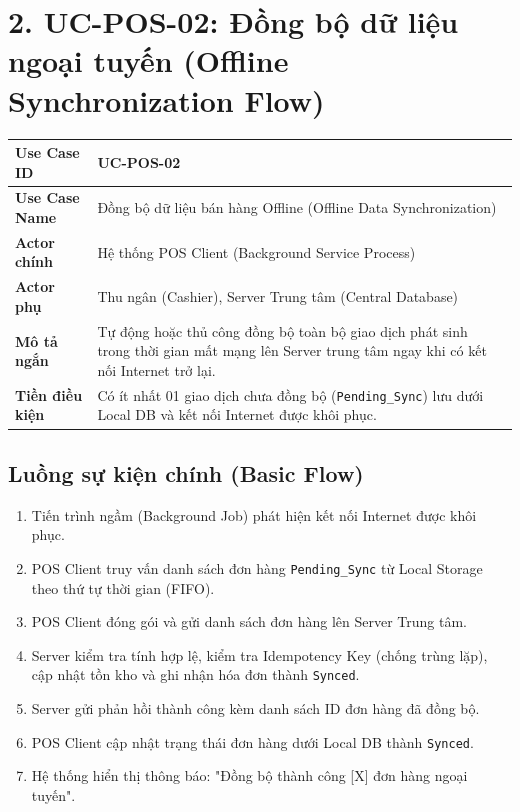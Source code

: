 \documentclass[11pt,a4paper]{article}
\begin{document}
	\vspace{1.5em}
	
	\section{2. UC-POS-02: Đồng bộ dữ liệu ngoại tuyến (Offline Synchronization Flow)}
	
	\begin{tabularx}{\textwidth}{|>{\bfseries\color{secondary}}p{3.5cm}|X|}
		\hline
		\rowcolor{tablehead} Use Case ID & UC-POS-02 \\ \hline
		Use Case Name & Đồng bộ dữ liệu bán hàng Offline (Offline Data Synchronization) \\ \hline
		Actor chính & Hệ thống POS Client (Background Service Process) \\ \hline
		Actor phụ & Thu ngân (Cashier), Server Trung tâm (Central Database) \\ \hline
		Mô tả ngắn & Tự động hoặc thủ công đồng bộ toàn bộ giao dịch phát sinh trong thời gian mất mạng lên Server trung tâm ngay khi có kết nối Internet trở lại. \\ \hline
		Tiền điều kiện & Có ít nhất 01 giao dịch chưa đồng bộ (\texttt{Pending\_Sync}) lưu dưới Local DB và kết nối Internet được khôi phục. \\ \hline
	\end{tabularx}
	
	\subsection*{Luồng sự kiện chính (Basic Flow)}
	\begin{enumerate}
		\item Tiến trình ngầm (Background Job) phát hiện kết nối Internet được khôi phục.
		\item POS Client truy vấn danh sách đơn hàng \texttt{Pending\_Sync} từ Local Storage theo thứ tự thời gian (FIFO).
		\item POS Client đóng gói và gửi danh sách đơn hàng lên Server Trung tâm.
		\item Server kiểm tra tính hợp lệ, kiểm tra Idempotency Key (chống trùng lặp), cập nhật tồn kho và ghi nhận hóa đơn thành \texttt{Synced}.
		\item Server gửi phản hồi thành công kèm danh sách ID đơn hàng đã đồng bộ.
		\item POS Client cập nhật trạng thái đơn hàng dưới Local DB thành \texttt{Synced}.
		\item Hệ thống hiển thị thông báo: "Đồng bộ thành công [X] đơn hàng ngoại tuyến".
	\end{enumerate}
	
\end{document}
